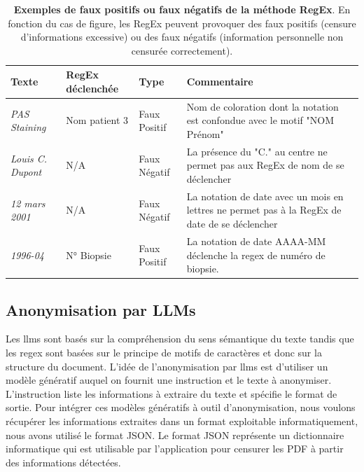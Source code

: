 \begin{table}[htbp]
\centering
\caption[Exemples de faux positifs ou faux négatifs de la méthode RegEx]{\textbf{Exemples de faux positifs ou faux négatifs de la méthode RegEx}. En fonction du cas de figure, les RegEx peuvent provoquer des faux positifs (censure d'informations excessive) ou des faux négatifs (information personnelle non censurée correctement).}
\label{tab:regex_fail}
\begin{tabularx}{\textwidth}{|l|l|l|X|}
\hline
\textbf{Texte} & \textbf{RegEx déclenchée} & \textbf{Type} & \textbf{Commentaire} \\ \hline
\textit{PAS Staining} & Nom patient 3 & Faux Positif & Nom de coloration dont la notation est confondue avec le motif "NOM Prénom" \\ \hline
\textit{Louis C. Dupont} & N/A & Faux Négatif & La présence du "C." au centre ne permet pas aux RegEx de nom de se déclencher \\ \hline
\textit{12 mars 2001} & N/A & Faux Négatif & La notation de date avec un mois en lettres ne permet pas à la RegEx de date de se déclencher \\ \hline
\textit{1996-04} & N° Biopsie & Faux Positif & La notation de date AAAA-MM déclenche la \gls{regex} de numéro de biopsie. \\ \hline
\end{tabularx}
\end{table}

\subsection{Anonymisation par LLMs}
Les \gls{llms} sont basés sur la compréhension du sens sémantique du texte tandis que les \gls{regex} sont basées sur le principe de motifs de caractères et donc sur la structure du document. L'idée de l'anonymisation par \gls{llms} est d'utiliser un modèle génératif auquel on fournit une instruction et le texte à anonymiser. L'instruction liste les informations à extraire du texte et spécifie le format de sortie. Pour intégrer ces modèles génératifs à outil d'anonymisation, nous voulons récupérer les informations extraites dans un format exploitable informatiquement, nous avons utilisé le format JSON. Le format JSON représente un dictionnaire informatique qui est utilisable par l'application pour censurer les PDF à partir des informations détectées.

